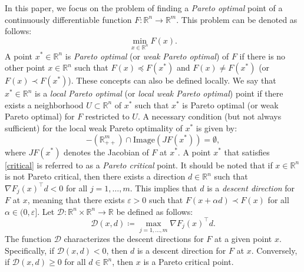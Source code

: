 \documentclass[11pt]{article}
\numberwithin{assumption}{section}
\newcommand{\D}{\mathcal{D}}
\begin{document}
In this paper, we focus on the problem of finding a {\it Pareto optimal} point of a continuously differentiable function $F: \mathbb{R}^n \rightarrow \mathbb{R}^m$. This problem can be denoted as follows:
\begin{equation} \label{vectorproblem}
\min_{x \in \mathbb{R}^n} F(x).
\end{equation}
A point $x^{\ast}\in\mathbb{R}^n$ is {\it Pareto optimal} (or {\it weak Pareto optimal}) of $F$ if there is no other point $x \in \mathbb{R}^n$ such that $F(x) \preceq F(x^{\ast})$ and $F(x) \neq F(x^{\ast})$ (or $F(x) \prec F(x^{\ast})$).
These concepts can also be defined locally. We say that $x^{\ast}\in\mathbb{R}^n$ is a {\it local Pareto optimal} (or  {\it local weak Pareto optimal}) point if there exists a neighborhood $U \subset \mathbb{R}^n$ of $x^{\ast}$ such that $x^{\ast}$ is Pareto optimal (or weak Pareto optimal) for $F$ restricted to $U$. A necessary condition (but not always sufficient) for the local weak Pareto optimality of $x^{\ast}$ is given by:
\begin{equation}\label{critical}
-(\mathbb{R}^m_{++}) \cap \text{Image}(JF(x^{\ast})) = \emptyset,
\end{equation}
where $JF(x^{\ast})$ denotes the Jacobian of $F$ at $x^{\ast}$. A point $x^{\ast}$ that satisfies \eqref{critical} is referred to as a {\it Pareto critical} point.
It should be noted that if $x\in\mathbb{R}^n$ is not Pareto critical, then there exists a direction $d\in\mathbb{R}^n$ such that $\nabla F_j(x)^\top  d < 0$ for all $j = 1, \ldots, m$. This implies that $d$ is a {\it descent direction} for $F$ at $x$, meaning that there exists $\varepsilon > 0$ such that $F(x + \alpha d) \prec F(x)$ for all $\alpha \in (0,\varepsilon]$. 
Let $\D: \mathbb{R}^n \times \mathbb{R}^n \rightarrow \mathbb{R}$ be defined as follows:
\begin{equation*} \label{dderiv}
\D(x,d) \coloneqq \max_{j = 1,\dots,m }\nabla F_j(x)^\top d.
\end{equation*}
The function $\D$ characterizes the descent directions for $F$ at a given point $x$. Specifically, if $\D(x,d) < 0$, then $d$ is a descent direction for $F$ at $x$. Conversely, if $\D(x,d) \geq 0$ for all $d \in \mathbb{R}^n$, then $x$ is a Pareto critical point. 
\end{document}
